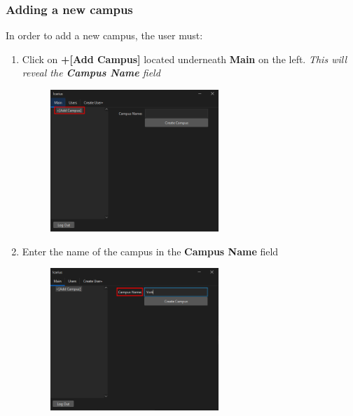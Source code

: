 \subsubsection{Adding a new campus}
In order to add a new campus, the user must:
\begin{enumerate}
    \item Click on \textbf{+[Add Campus]} located underneath \textbf{Main} on the left. \textit{This will reveal the \textbf{Campus Name} field}
    \begin{figure}[H]
        \centering
        \includegraphics[width=0.6\textwidth]{MainTab/AddCampus/addCampus.PNG}
    \end{figure}
    
    \item Enter the name of the campus in the \textbf{Campus Name} field
    \begin{figure}[H]
        \centering
        \includegraphics[width=0.6\textwidth]{MainTab/AddCampus/addCampusName.PNG}
    \end{figure}


\end{enumerate}

